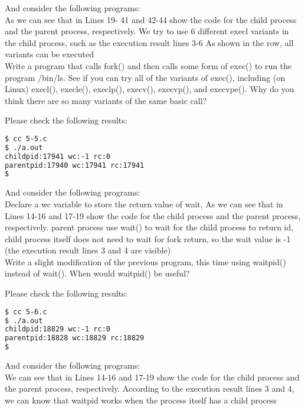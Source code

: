 \documentclass[10pt, answers]{exam}
\begin{document}
\begin{questions}
And consider the following programs:\\

As we can see that in Lines 19- 41 and 42-44 show the code for the child process and the parent process, respectively. We try to use 6 different execl variants in the child process, such as the execution result lines 3-6 As shown in the row, all variants can be executed
\\



\question
Write a program that calls fork() and then calls some form of exec() to run the program /bin/ls. See if you can try all of the variants of exec(), including (on Linux) execl(), execle(), execlp(), execv(), execvp(), and execvpe(). Why do you think there are so many variants of the same basic call?

\begin{solution}
Please check the following results:
\begin{lstlisting}[language=bash]
$ cc 5-5.c
$ ./a.out
childpid:17941 wc:-1 rc:0
parentpid:17940 wc:17941 rc:17941
$
\end{lstlisting}
\end{solution}


And consider the following programs:\\

Declare a wc variable to store the return value of wait, As we can see that in Lines 14-16 and 17-19 show the code for the child process and the parent process, respectively. parent process use wait() to wait for the child process to return id, child process itself does not need to wait for fork return, so the wait value is -1 (the execution result lines 3 and 4 are visible)
\\



\question
Write a slight modification of the previous program, this time using waitpid() instead of wait(). When would waitpid() be useful?

\begin{solution}
Please check the following results:
\begin{lstlisting}[language=bash]
$ cc 5-6.c
$ ./a.out
childpid:18829 wc:-1 rc:0
parentpid:18828 wc:18829 rc:18829
$
\end{lstlisting}
\end{solution}


And consider the following programs:\\

We can see that in Lines 14-16 and 17-19 show the code for the child process and the parent process, respectively. According to the execution result lines 3 and 4, we can know that waitpid works when the process itself has a child process
\\



\end{questions}
\end{document}
